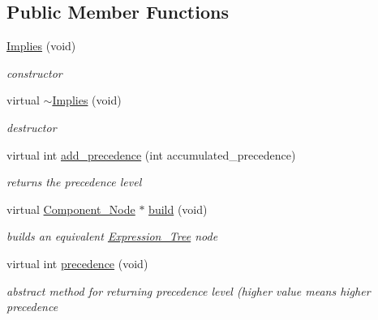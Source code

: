 \subsection*{Public Member Functions}
\begin{DoxyCompactItemize}
\item 
\hyperlink{classMadara_1_1Expression__Tree_1_1Implies_aeb7fc32dc698d77eb454e879e44de610}{Implies} (void)
\begin{DoxyCompactList}\small\item\em constructor \item\end{DoxyCompactList}\item 
virtual \hyperlink{classMadara_1_1Expression__Tree_1_1Implies_a90d09d61489e5a383a1afae78930b489}{$\sim$Implies} (void)
\begin{DoxyCompactList}\small\item\em destructor \item\end{DoxyCompactList}\item 
virtual int \hyperlink{classMadara_1_1Expression__Tree_1_1Implies_a23a5c61c0c03a29f761ce9ac004097d4}{add\_\-precedence} (int accumulated\_\-precedence)
\begin{DoxyCompactList}\small\item\em returns the precedence level \item\end{DoxyCompactList}\item 
virtual \hyperlink{classMadara_1_1Expression__Tree_1_1Component__Node}{Component\_\-Node} $\ast$ \hyperlink{classMadara_1_1Expression__Tree_1_1Implies_a9deae85b4162922c63ecf6a114d0f76d}{build} (void)
\begin{DoxyCompactList}\small\item\em builds an equivalent \hyperlink{classMadara_1_1Expression__Tree_1_1Expression__Tree}{Expression\_\-Tree} node \item\end{DoxyCompactList}\item 
virtual int \hyperlink{classMadara_1_1Expression__Tree_1_1Symbol_ac060dedb8d16864591b259df375109b3}{precedence} (void)
\begin{DoxyCompactList}\small\item\em abstract method for returning precedence level (higher value means higher precedence \item\end{DoxyCompactList}\end{DoxyCompactItemize}
